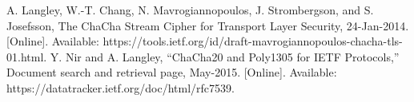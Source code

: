 \documentclass[conference]{IEEEtran}
\begin{document}

\begin{thebibliography}{00}
 A. Langley, W.-T. Chang, N. Mavrogiannopoulos, J. Strombergson, and S. Josefsson, The ChaCha Stream Cipher for Transport Layer Security, 24-Jan-2014. [Online]. Available: https://tools.ietf.org/id/draft-mavrogiannopoulos-chacha-tls-01.html.
 Y. Nir and A. Langley, “ChaCha20 and Poly1305 for IETF Protocols,” Document search and retrieval page, May-2015. [Online]. Available: https://datatracker.ietf.org/doc/html/rfc7539.
\end{thebibliography}
\vspace{12pt}
\end{document}
